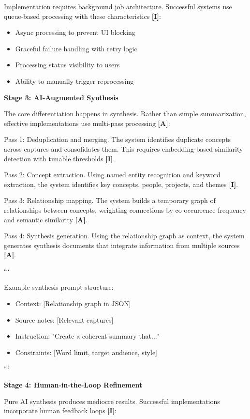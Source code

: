 \documentclass[a4paper,11pt]{article}
\newcommand{\ilabel}{\textbf{\textcolor{icolor}{[I]}}}
\newcommand{\alabel}{\textbf{\textcolor{acolor}{[A]}}}
\begin{document}
Implementation requires background job architecture. Successful systems use queue-based processing with these characteristics \ilabel{}:

\begin{itemize}
  \item Async processing to prevent UI blocking
  \item Graceful failure handling with retry logic
  \item Processing status visibility to users
  \item Ability to manually trigger reprocessing
\end{itemize}

\textbf{Stage 3: AI-Augmented Synthesis}\par
The core differentiation happens in synthesis. Rather than simple summarization, effective implementations use multi-pass processing \alabel{}:


Pass 1: Deduplication and merging. The system identifies duplicate concepts across captures and consolidates them. This requires embedding-based similarity detection with tunable thresholds \ilabel{}.


Pass 2: Concept extraction. Using named entity recognition and keyword extraction, the system identifies key concepts, people, projects, and themes \ilabel{}.


Pass 3: Relationship mapping. The system builds a temporary graph of relationships between concepts, weighting connections by co-occurrence frequency and semantic similarity \alabel{}.


Pass 4: Synthesis generation. Using the relationship graph as context, the system generates synthesis documents that integrate information from multiple sources \alabel{}.


```

Example synthesis prompt structure:

\begin{itemize}
  \item Context: [Relationship graph in JSON]
  \item Source notes: [Relevant captures]
  \item Instruction: "Create a coherent summary that..."
  \item Constraints: [Word limit, target audience, style]
\end{itemize}
```


\textbf{Stage 4: Human-in-the-Loop Refinement}\par
Pure AI synthesis produces mediocre results. Successful implementations incorporate human feedback loops \ilabel{}:
\end{document}
